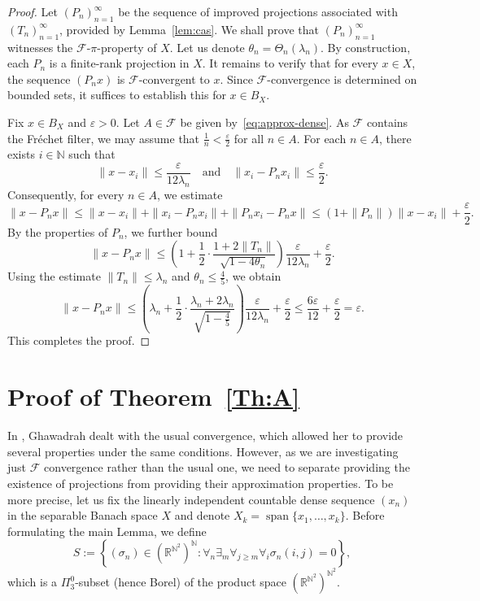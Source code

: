 \documentclass[12pt,fleqn]{amsart}
\newcommand{\IR}{\mathbb{R}}
\newcommand{\N}{\mathbb{N}}
\newcommand{\FF}{\mathscr{F}}
\renewcommand{\leq}{\leqslant}
\renewcommand{\geq}{\geqslant}
\theoremstyle{definition}
\theoremstyle{remark}
\begin{document}
\begin{proof}
    Let $(P_n)_{n=1}^\infty$ be the sequence of improved projections associated with $(T_n)_{n=1}^\infty$, provided by Lemma~\ref{lem:cas}. We shall prove that $(P_n)_{n=1}^\infty$ witnesses the $\mathcal{F}$-$\pi$-property of $X$. Let us denote $
    \theta_n=\Theta_n(\lambda_n)$. By construction, each $P_n$ is a finite-rank projection in $X$. It remains to verify that for every $x \in X$, the sequence $(P_n x)$ is $\mathcal{F}$-convergent to $x$. Since $\mathcal{F}$-convergence is determined on bounded sets, it suffices to establish this for $x \in B_X$.

    Fix $x \in B_X$ and $\varepsilon > 0$. Let $A \in \mathcal{F}$ be given by~\eqref{eq:approx-dense}. As $\mathcal{F}$ contains the Fréchet filter, we may assume that $\frac{1}{n} < \frac{\varepsilon}{2}$ for all $n \in A$. For each $n \in A$, there exists $i \in \mathbb{N}$ such that
    \[
        \|x - x_i\| \leq \frac{\varepsilon}{12 \lambda_n}
        \quad \text{and} \quad
        \|x_i - P_n x_i\| \leq \frac{\varepsilon}{2}.
    \]
    Consequently, for every $n \in A$, we estimate
    \[
        \|x - P_n x\| 
        \leq \|x - x_i\| + \|x_i - P_n x_i\| + \|P_n x_i - P_n x\|
        \leq (1 + \|P_n\|) \|x - x_i\| + \frac{\varepsilon}{2}.
    \]
    By the properties of $P_n$, we further bound
    \[
        \|x - P_n x\| 
        \leq \left(1 + \frac{1}{2} \cdot \frac{1 + 2\|T_n\|}{\sqrt{1 - 4\theta_n}} \right) \frac{\varepsilon}{12 \lambda_n} + \frac{\varepsilon}{2}.
    \]
    Using the estimate $\|T_n\| \leq \lambda_n$ and $\theta_n \leq \frac{4}{5}$, we obtain
    \[
        \|x - P_n x\| 
        \leq \left( \lambda_n + \frac{1}{2} \cdot \frac{\lambda_n + 2\lambda_n}{\sqrt{1 - \frac{4}{5}}} \right) \frac{\varepsilon}{12 \lambda_n} + \frac{\varepsilon}{2}
        \leq \frac{6\varepsilon}{12} + \frac{\varepsilon}{2} 
        = \varepsilon.
    \]
    This completes the proof.
\end{proof}

\section{Proof of Theorem~\ref{Th:A}}

In \cite{GhaFund}, Ghawadrah dealt with the usual convergence, which allowed her to provide several properties under the same conditions. However, as we are investigating just $\FF$ convergence rather than the usual one, we need to separate providing the existence of projections from providing their approximation properties. To be more precise, let us fix the linearly independent countable dense sequence $(x_n)$ in the separable Banach space $X$ and denote $X_k=\operatorname{span}\{x_1, \ldots, x_k \}$. 
Before formulating the main Lemma, we define 
\[
    S:= \left\{(\sigma_{n}) \in (\IR^{\N^2})^{\N}\colon \forall_{n}  \exists_{m} \forall_{j \geq m} \forall_{i} \sigma_{n}(i,j) = 0   \right\},
\]
which is a $\Pi^0_3$-subset (hence Borel) of the product space $(\IR^{\N^2})^{\N^2}$.
\end{document}
